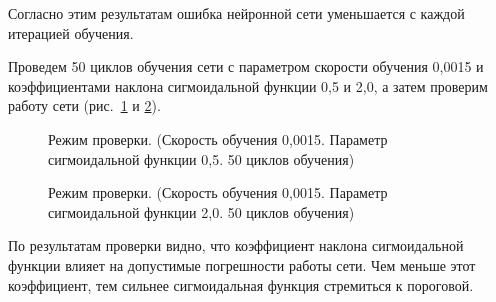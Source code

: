 Согласно этим результатам ошибка нейронной сети уменьшается с каждой итерацией обучения.

Проведем 50 циклов обучения сети с параметром скорости обучения 0,0015 и коэффициентами наклона сигмоидальной функции 0,5 и 2,0, а затем проверим работу сети (рис.~\ref{ris:check_0,0015_0,5_50} и \ref{ris:check_0,0015_2,0_50}).

\begin{figure}[h]
\caption{Режим проверки. (Скорость обучения 0,0015. Параметр сигмоидальной функции 0,5. 50 циклов обучения)}
\label{ris:check_0,0015_0,5_50}
\end{figure}

\begin{figure}[h]
\caption{Режим проверки. (Скорость обучения 0,0015. Параметр сигмоидальной функции 2,0. 50 циклов обучения)}
\label{ris:check_0,0015_2,0_50}
\end{figure}

По результатам проверки видно, что коэффициент наклона сигмоидальной функции влияет на допустимые погрешности работы сети. Чем меньше этот коэффициент, тем сильнее сигмоидальная функция стремиться к пороговой.




